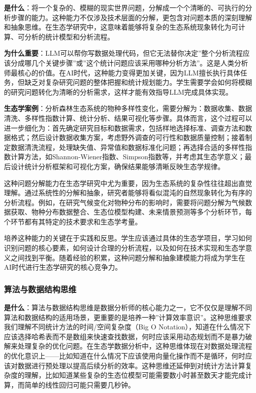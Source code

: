 \documentclass[
]{book}
\begin{document}
\textbf{是什么}：将一个复杂的、模糊的现实世界问题，分解成一个个清晰的、可执行的分析步骤的能力。这种能力不仅涉及技术层面的分解，更包含对问题本质的深刻理解和抽象思维。在生态学研究中，这意味着能够将复杂的生态系统现象转化为可计算、可分析的统计模型和分析流程。

\textbf{为什么重要}：LLM可以帮你写数据处理代码，但它无法替你决定''整个分析流程应该分成哪几个关键步骤''或''这个统计问题应该采用哪种分析方法''。这是人类分析师最核心的价值。在AI时代，这种能力变得更加关键，因为LLM擅长执行具体任务，但缺乏对复杂研究问题的整体把握和统计规划能力。学生需要学会如何将模糊的研究问题转化为清晰的分析需求，这样才能有效指导LLM完成具体实现。

\textbf{生态学案例}：分析森林生态系统的物种多样性变化，需要分解为：数据收集、数据清洗、多样性指数计算、统计分析、结果可视化等步骤。具体而言，这个过程可以进一步细化为：首先确定研究目标和数据需求，包括样地选择标准、调查方法和数据格式；然后设计数据收集方案，考虑野外调查的可行性和数据质量控制；接着制定数据清洗流程，处理缺失值、异常值和数据标准化问题；再选择合适的多样性指数计算方法，如Shannon-Wiener指数、Simpson指数等，并考虑其生态学意义；最后设计统计分析框架和可视化方案，确保结果能够清晰反映生态学规律。

这种问题分解能力在生态学研究中尤为重要，因为生态系统的复杂性往往超出直觉理解。通过系统性的分解和抽象，研究者能够将看似混沌的自然现象转化为有序的分析流程。例如，在研究气候变化对物种分布的影响时，需要将问题分解为气候数据获取、物种分布数据整合、生态位模型构建、未来情景预测等多个分析环节，每个环节都有其特定的技术要求和生态学考量。

培养这种能力的关键在于实践和反思。学生应该通过具体的生态学项目，学习如何识别问题的核心要素，如何设计合理的分析流程，以及如何在技术实现和生态学意义之间找到平衡。随着经验的积累，这种问题分解和抽象建模能力将成为学生在AI时代进行生态学研究的核心竞争力。

\hypertarget{ux7b97ux6cd5ux4e0eux6570ux636eux7ed3ux6784ux601dux7ef4}{%
\subsubsection{算法与数据结构思维}\label{ux7b97ux6cd5ux4e0eux6570ux636eux7ed3ux6784ux601dux7ef4}}

\textbf{是什么}：算法与数据结构思维是数据分析师的核心能力之一，它不仅仅是理解不同算法和数据结构的适用场景，更重要的是培养一种''计算效率意识''。这种思维要求我们理解不同统计方法的时间/空间复杂度（Big O Notation），知道在什么情况下应该选择哈希表而不是数组来快速查找数据，何时应该采用动态规划而不是暴力破解来处理复杂的优化问题。在生态学数据分析中，这种思维体现在对数据处理流程的优化意识上------比如知道在什么情况下应该使用向量化操作而不是循环，何时应该对数据进行预处理以提高后续分析的效率。这种思维还延伸到对统计方法计算复杂度的理解，比如知道某些复杂的生态位模型可能需要数小时甚至数天才能完成计算，而简单的线性回归可能只需要几秒钟。
\end{document}
